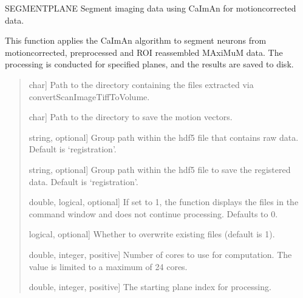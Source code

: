 \documentclass[letterpaper,10pt,english]{sphinxmanual}
\begin{document}
\begin{fulllineitems}
\label{\detokenize{api/core:segmentPlane}}
\pysigstartsignatures
{}
\pysigstopsignatures
\sphinxAtStartPar
SEGMENTPLANE Segment imaging data using CaImAn for motion\sphinxhyphen{}corrected data.

\sphinxAtStartPar
This function applies the CaImAn algorithm to segment neurons from
motion\sphinxhyphen{}corrected, pre\sphinxhyphen{}processed and ROI re\sphinxhyphen{}assembled MAxiMuM data.
The processing is conducted for specified planes, and the results
are saved to disk.
\begin{quote}\begin{description}
\begin{description}
\sphinxlineitem{\sphinxstylestrong{data\_path}}{[}char{]}
\sphinxAtStartPar
Path to the directory containing the files extracted via convertScanImageTiffToVolume.

\sphinxlineitem{\sphinxstylestrong{save\_path}}{[}char{]}
\sphinxAtStartPar
Path to the directory to save the motion vectors.

\sphinxlineitem{\sphinxstylestrong{data\_input\_group}}{[}string, optional{]}
\sphinxAtStartPar
Group path within the hdf5 file that contains raw data.
Default is ‘registration’.

\sphinxlineitem{\sphinxstylestrong{data\_output\_group}}{[}string, optional{]}
\sphinxAtStartPar
Group path within the hdf5 file to save the registered data.
Default is ‘registration’.

\sphinxlineitem{\sphinxstylestrong{debug\_flag}}{[}double, logical, optional{]}
\sphinxAtStartPar
If set to 1, the function displays the files in the command window and does
not continue processing. Defaults to 0.

\sphinxlineitem{\sphinxstylestrong{overwrite}}{[}logical, optional{]}
\sphinxAtStartPar
Whether to overwrite existing files (default is 1).

\sphinxlineitem{\sphinxstylestrong{num\_cores}}{[}double, integer, positive{]}
\sphinxAtStartPar
Number of cores to use for computation. The value is limited to a maximum
of 24 cores.

\sphinxlineitem{\sphinxstylestrong{start\_plane}}{[}double, integer, positive{]}
\sphinxAtStartPar
The starting plane index for processing.


\end{description}
\end{description}
\end{quote}
\end{fulllineitems}
\end{document}
